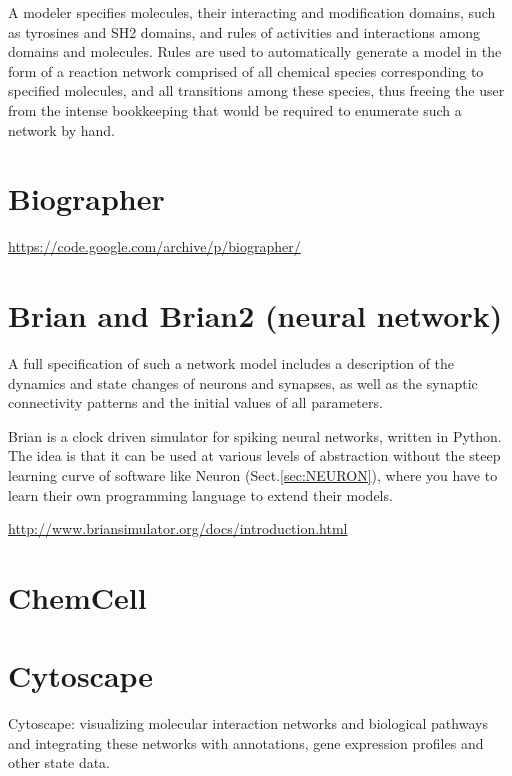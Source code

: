 A modeler specifies molecules, their interacting and modification domains, such
as tyrosines and SH2 domains, and rules of activities and interactions among
domains and molecules. Rules are used to automatically generate a model in the
form of a reaction network comprised of all chemical species corresponding to
specified molecules, and all transitions among these species, thus freeing the
user from the intense bookkeeping that would be required to enumerate such a
network by hand.



\section{Biographer}
\label{sec:biographer}

\url{https://code.google.com/archive/p/biographer/}




\section{Brian and Brian2 (neural network)}
\label{sec:Brian}
\label{sec:Brian2}

A full specification of such a network model includes a description of
the dynamics and state changes of neurons and synapses, as well as the synaptic
connectivity patterns and the initial values of all parameters.


Brian is a clock driven simulator for spiking neural networks, written in
Python.
The idea is that it can be used at various levels of abstraction without the
steep learning curve of software like Neuron (Sect.\ref{sec:NEURON}), where you
have to learn their own programming language to extend their models.

\url{http://www.briansimulator.org/docs/introduction.html}



\section{ChemCell}
\label{sec:ChemCell}


\section{Cytoscape}
\label{sec:Cytoscape}

Cytoscape:  visualizing molecular interaction networks and biological pathways
and integrating these networks with annotations, gene expression profiles and
other state data.


